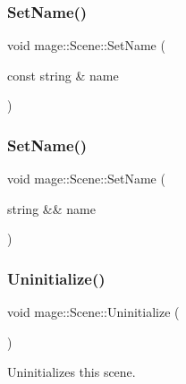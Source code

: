 \hypertarget{classmage_1_1_scene_a9b7c1c2f84cc3b3c5ff3de4f29d830e9}{}\label{classmage_1_1_scene_a9b7c1c2f84cc3b3c5ff3de4f29d830e9} 
\subsubsection{\texorpdfstring{Set\+Name()}{SetName()}\hspace{0.1cm}{\footnotesize\ttfamily [1/2]}}
{\footnotesize\ttfamily void mage\+::\+Scene\+::\+Set\+Name (\begin{DoxyParamCaption}\item[{const string \&}]{name }\end{DoxyParamCaption})}

\hypertarget{classmage_1_1_scene_a86b2e6e764ee134af1706f90603a6596}{}\label{classmage_1_1_scene_a86b2e6e764ee134af1706f90603a6596} 
\subsubsection{\texorpdfstring{Set\+Name()}{SetName()}\hspace{0.1cm}{\footnotesize\ttfamily [2/2]}}
{\footnotesize\ttfamily void mage\+::\+Scene\+::\+Set\+Name (\begin{DoxyParamCaption}\item[{string \&\&}]{name }\end{DoxyParamCaption})\hspace{0.3cm}{\ttfamily [noexcept]}}

\hypertarget{classmage_1_1_scene_a714dc33c04dc2b8e2cec93564905b174}{}\label{classmage_1_1_scene_a714dc33c04dc2b8e2cec93564905b174} 
\subsubsection{\texorpdfstring{Uninitialize()}{Uninitialize()}}
{\footnotesize\ttfamily void mage\+::\+Scene\+::\+Uninitialize (\begin{DoxyParamCaption}{ }\end{DoxyParamCaption})}

Uninitializes this scene. \hypertarget{classmage_1_1_scene_aa10e6eafc00834f63f146589326cbfe2}{}\label{classmage_1_1_scene_aa10e6eafc00834f63f146589326cbfe2} 
